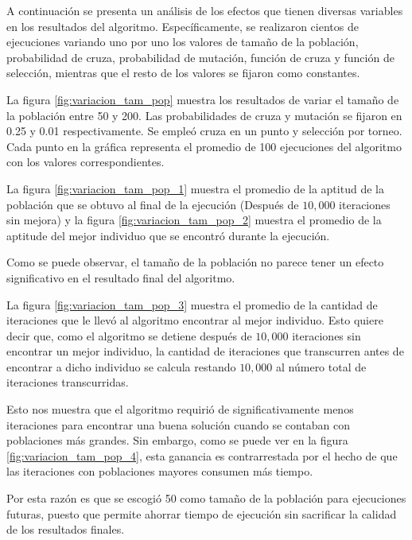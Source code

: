 \documentclass[12pt]{article} %
\begin{document}
A continuación se presenta un análisis de los efectos que tienen diversas variables
en los resultados del algoritmo. Específicamente, se realizaron cientos de ejecuciones
variando uno por uno los valores de tamaño de la población, probabilidad de cruza, probabilidad
de mutación, función de cruza y función de selección, mientras que el resto de los
valores se fijaron como constantes.

\pagebreak


La figura \ref{fig:variacion_tam_pop} muestra los resultados de variar el tamaño
de la población entre 50 y 200. Las probabilidades de cruza y mutación se fijaron
en 0.25 y 0.01 respectivamente. Se empleó cruza en un punto y selección por torneo.
Cada punto en la gráfica representa el promedio de 100 ejecuciones del algoritmo
con los valores correspondientes.

La figura \ref{fig:variacion_tam_pop_1} muestra el promedio de la aptitud de la
población que se obtuvo al final de la ejecución (Después de $10,000$ iteraciones
sin mejora) y la figura \ref{fig:variacion_tam_pop_2} muestra el promedio de la
aptitude del mejor individuo que se encontró durante la ejecución.

Como se puede observar, el tamaño de la población no parece tener un efecto
significativo en el resultado final del algoritmo.

La figura \ref{fig:variacion_tam_pop_3} muestra el promedio de la cantidad de
iteraciones que le llevó al algoritmo encontrar al mejor individuo. Esto quiere
decir que, como el algoritmo se detiene después de $10,000$ iteraciones sin encontrar
un mejor individuo, la cantidad de iteraciones que transcurren antes de encontrar
a dicho individuo se calcula restando $10,000$ al número total de iteraciones
transcurridas.

Esto nos muestra que el algoritmo requirió de significativamente menos iteraciones
para encontrar una buena solución cuando se contaban con poblaciones más grandes.
Sin embargo, como se puede ver en la figura \ref{fig:variacion_tam_pop_4}, esta
ganancia es contrarrestada por el hecho de que las iteraciones con poblaciones
mayores consumen más tiempo.

Por esta razón es que se escogió 50 como tamaño de la población para ejecuciones
futuras, puesto que permite ahorrar tiempo de ejecución sin sacrificar la calidad
de los resultados finales.
\end{document}
